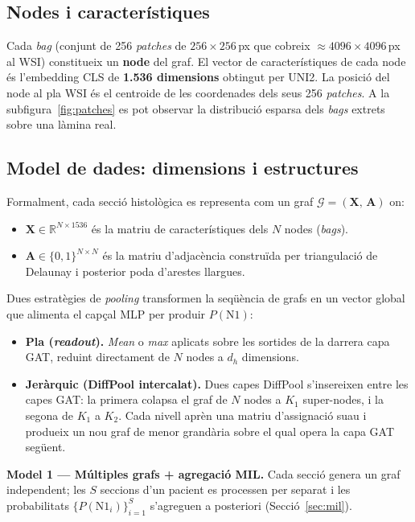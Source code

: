 \documentclass[10pt,a4paper,twocolumn,twoside]{article}
\begin{document}
\subsection{Nodes i característiques}

Cada \textit{bag} (conjunt de 256 \textit{patches} de $256{\times}256$\,px que cobreix
$\approx4096{\times}4096$\,px al WSI) constitueix un \textbf{node} del graf. El vector de
característiques de cada node és l'embedding CLS de \textbf{1.536 dimensions} obtingut per UNI2.
La posició del node al pla WSI és el centroide de les coordenades dels seus 256 \textit{patches}.
A la subfigura~\ref{fig:patches} es pot observar la distribució esparsa dels \textit{bags}
extrets sobre una làmina real.

\subsection{Model de dades: dimensions i estructures}
\label{sec:model-dades}

Formalment, cada secció histològica es representa com un graf
$\mathcal{G} = (\mathbf{X},\,\mathbf{A})$ on:
\begin{itemize}
  \item $\mathbf{X} \in \mathbb{R}^{N \times 1536}$ és la matriu de característiques dels $N$ nodes
        (\textit{bags}).
  \item $\mathbf{A} \in \{0,1\}^{N \times N}$ és la matriu d'adjacència construïda per triangulació
        de Delaunay i posterior poda d'arestes llargues.
\end{itemize}

Dues estratègies de \textit{pooling} transformen la seqüència de grafs en un vector global que
alimenta el capçal MLP per produir $P(\text{N1})$:
\begin{itemize}
  \item \textbf{Pla (\textit{readout}).} \textit{Mean} o \textit{max} aplicats sobre les sortides de
  la darrera capa GAT, reduint directament de $N$ nodes a $d_h$ dimensions.
  \item \textbf{Jeràrquic (DiffPool intercalat).} Dues capes DiffPool s'insereixen entre les capes
  GAT: la primera colapsa el graf de $N$ nodes a $K_1$ super-nodes, i la segona de $K_1$ a $K_2$.
  Cada nivell aprèn una matriu d'assignació suau i produeix un nou graf de menor grandària sobre el
  qual opera la capa GAT següent.
\end{itemize}

\textbf{Model 1 --- Múltiples grafs + agregació MIL.}
Cada secció genera un graf independent; les $S$ seccions d'un pacient es processen per separat i les
probabilitats $\{P(\text{N1}_i)\}_{i=1}^{S}$ s'agreguen a posteriori (Secció~\ref{sec:mil}).
\end{document}
